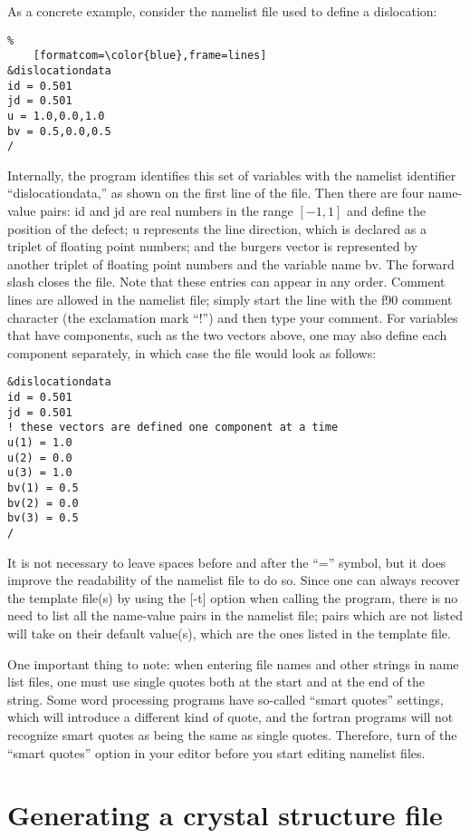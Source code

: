 \documentclass[DIV=calc, paper=letter, fontsize=11pt]{scrartcl}	 %
\begin{document}
As a concrete example, consider the namelist file used to define a dislocation:
\begin{Verbatim}%
	[formatcom=\color{blue},frame=lines]
&dislocationdata
id = 0.501
jd = 0.501
u = 1.0,0.0,1.0
bv = 0.5,0.0,0.5
/
\end{Verbatim}
Internally, the program identifies this set of variables with the namelist identifier ``dislocationdata,'' as shown on the first line of the file.
Then there are four name-value pairs: \textsf{id} and \textsf{jd} are real numbers in the range $[-1,1]$ and define the position
of the defect; \textsf{u} represents the line direction, which is declared as a triplet of 
floating point numbers; and the burgers vector is represented by another triplet of floating point numbers and the variable name \textsf{bv}.
The forward slash closes the file.  Note that these entries can appear in any order. Comment lines are allowed in the namelist
file; simply start the line with the f90 comment character (the exclamation mark ``!'') and then type your comment.  For variables that 
have components, such as the two vectors above, one may also define each component separately, in which case the file would look
as follows:
\begin{verbatim}
&dislocationdata
id = 0.501
jd = 0.501
! these vectors are defined one component at a time
u(1) = 1.0 
u(2) = 0.0 
u(3) = 1.0
bv(1) = 0.5
bv(2) = 0.0
bv(3) = 0.5
/
\end{verbatim}
It is not necessary to leave spaces before and after the ``='' symbol, but it does improve the readability of the namelist file to do so. Since 
one can always recover the template file(s) by using the [-t] option when calling the program, there is no need to list all the name-value pairs
in the namelist file; pairs which are not listed will take on their default value(s), which are the ones listed in the template file.

One important thing to note: when entering file names and other strings in name list files, one must use single quotes both at the start and at 
the end of the string.  Some word processing programs have so-called ``smart quotes'' settings, which will introduce a different kind of quote,
and the fortran programs will not recognize smart quotes as being the same as single quotes.  Therefore, turn of the ``smart quotes'' option
in your editor before you start editing namelist files.


\section{Generating a crystal structure file\label{sec:f90input5}}
\end{document}

